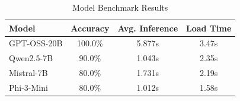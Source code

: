 \begin{table}[h]
\centering
\caption{Model Benchmark Results}
\begin{tabular}{lccc}
\toprule
\textbf{Model} & \textbf{Accuracy} & \textbf{Avg. Inference} & \textbf{Load Time} \\
\midrule
GPT-OSS-20B & 100.0\% & 5.877s & 3.47s \\
Qwen2.5-7B & 90.0\% & 1.043s & 2.35s \\
Mistral-7B & 80.0\% & 1.731s & 2.19s \\
Phi-3-Mini & 80.0\% & 1.012s & 1.58s \\
\bottomrule
\end{tabular}
\label{tab:benchmark}
\end{table}